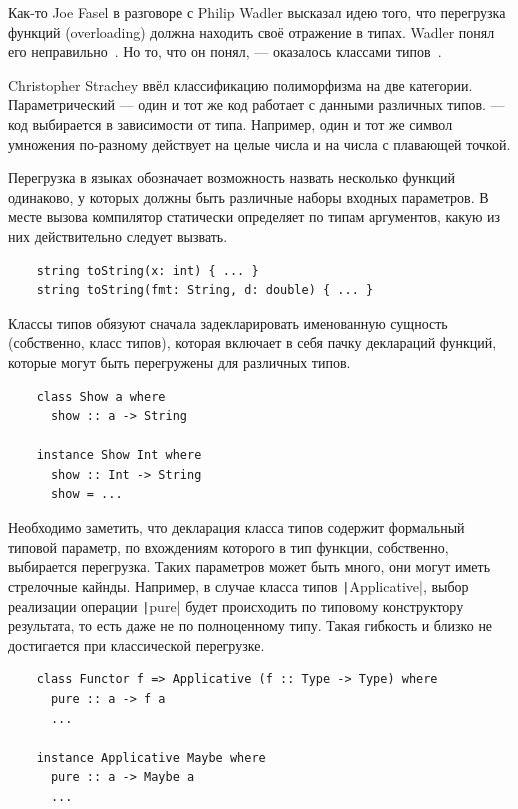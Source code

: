 
Как-то Joe Fasel в разговоре с Philip Wadler высказал идею того, что перегрузка функций (overloading) должна находить своё отражение в типах.
Wadler понял его неправильно~\cite{hudak2007history}.
Но то, что он понял, --- оказалось классами типов~\cite{wadler1989make}.

Christopher Strachey ввёл классификацию полиморфизма на две категории.
Параметрический --- один и тот же код работает с данными различных типов.
 --- код выбирается в зависимости от типа.
Например, один и тот же символ умножения по-разному действует на целые числа и на числа с плавающей точкой.

Перегрузка в языках обозначает возможность назвать несколько функций одинаково, у которых должны быть различные наборы входных параметров.
В месте вызова компилятор статически определяет по типам аргументов, какую из них действительно следует вызвать.
\begin{verbatim}
    string toString(x: int) { ... }
    string toString(fmt: String, d: double) { ... }
\end{verbatim}

Классы типов обязуют сначала задекларировать именованную сущность (собственно, класс типов), которая включает в себя пачку деклараций функций, которые могут быть перегружены для различных типов.
\begin{verbatim}
    class Show a where
      show :: a -> String

    instance Show Int where
      show :: Int -> String
      show = ...
\end{verbatim}

Необходимо заметить, что декларация класса типов содержит формальный типовой параметр, по вхождениям которого в тип функции, собственно, выбирается перегрузка.
Таких параметров может быть много, они могут иметь стрелочные кайнды.
Например, в случае класса типов \texttt|Applicative|, выбор реализации операции \texttt|pure| будет происходить по типовому конструктору результата, то есть даже не по полноценному типу.
Такая гибкость и близко не достигается при классической перегрузке.
\begin{verbatim}
    class Functor f => Applicative (f :: Type -> Type) where
      pure :: a -> f a
      ...

    instance Applicative Maybe where
      pure :: a -> Maybe a
      ...
\end{verbatim}


